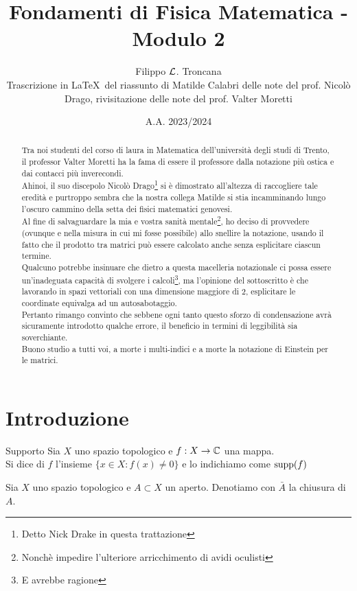 \documentclass{article}
\title{Fondamenti di Fisica Matematica - Modulo 2}
\author{Filippo $\mathcal{L}$. Troncana \\ \footnotesize Trascrizione in \LaTeX\ del riassunto di Matilde Calabri delle note del prof. Nicolò Drago, rivisitazione delle note del prof. Valter Moretti}
\date{A.A. 2023/2024}
\begin{document}
\maketitle


\begin{abstract}\normalsize
    Tra noi studenti del corso di laura in Matematica dell'università degli studi di Trento, il professor Valter Moretti ha la fama di essere il professore dalla notazione più ostica e dai contacci più inverecondi.\\
    Ahinoi, il suo discepolo Nicolò Drago\footnote{Detto Nick Drake in questa trattazione} si è dimostrato all'altezza di raccogliere tale eredità e purtroppo sembra che la nostra collega Matilde si stia incamminando lungo l'oscuro cammino della setta dei fisici matematici genovesi.\\
    Al fine di salvaguardare la mia e vostra sanità mentale\footnote{Nonchè impedire l'ulteriore arricchimento di avidi oculisti}, ho deciso di provvedere (ovunque e nella misura in cui mi fosse possibile) allo snellire la notazione, usando il  fatto che il prodotto tra matrici può essere calcolato anche senza esplicitare ciascun termine.\\
    Qualcuno potrebbe insinuare che dietro a questa macelleria notazionale ci possa essere un'inadeguata capacità di svolgere i calcoli\footnote{E avrebbe ragione}, ma l'opinione del sottoscritto è che lavorando in spazi vettoriali con una dimensione maggiore di $2$, esplicitare le coordinate equivalga ad un autosabotaggio.\\
    Pertanto rimango convinto che sebbene ogni tanto questo sforzo di condensazione avrà sicuramente introdotto qualche errore, il beneficio in termini di leggibilità sia soverchiante.\\
    Buono studio a tutti voi, a morte i multi-indici e a morte la notazione di Einstein per le matrici.    
\end{abstract}


\tableofcontents

\section{Introduzione}

\begin{definition}{Supporto}{}
    Sia $X$ uno spazio topologico e $f:X\to\mathbb{C}$ una mappa.\\
    Si dice  di $f$ l'insieme $\{x\in X : f(x)\neq 0\}$ e lo indichiamo come $\operatorname{supp}(f)$
\end{definition}
\begin{notation}
    Sia $X$ uno spazio topologico e $A\subset X$ un aperto. Denotiamo con $\bar{A}$ la chiusura di $A$.
\end{notation}
\end{document}
